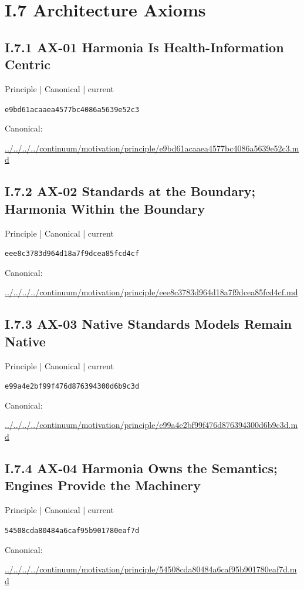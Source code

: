 \documentclass[10pt,a4paper]{article}
\begin{document}
\section*{I.7 Architecture Axioms}
\subsection*{I.7.1 AX-01 Harmonia Is Health-Information Centric}
\label{element-e9bd61acaaea4577bc4086a5639e52c3}
{\small Principle | Canonical | current}\par
\texttt{e9bd61acaaea4577bc4086a5639e52c3}\par
Canonical: \par
{\footnotesize\url{../../../../continuum/motivation/principle/e9bd61acaaea4577bc4086a5639e52c3.md}}\par
\subsection*{I.7.2 AX-02 Standards at the Boundary; Harmonia Within the Boundary}
\label{element-eee8c3783d964d18a7f9dcea85fcd4cf}
{\small Principle | Canonical | current}\par
\texttt{eee8c3783d964d18a7f9dcea85fcd4cf}\par
Canonical: \par
{\footnotesize\url{../../../../continuum/motivation/principle/eee8c3783d964d18a7f9dcea85fcd4cf.md}}\par
\subsection*{I.7.3 AX-03 Native Standards Models Remain Native}
\label{element-e99a4e2bf99f476d876394300d6b9c3d}
{\small Principle | Canonical | current}\par
\texttt{e99a4e2bf99f476d876394300d6b9c3d}\par
Canonical: \par
{\footnotesize\url{../../../../continuum/motivation/principle/e99a4e2bf99f476d876394300d6b9c3d.md}}\par
\subsection*{I.7.4 AX-04 Harmonia Owns the Semantics; Engines Provide the Machinery}
\label{element-54508cda80484a6caf95b901780eaf7d}
{\small Principle | Canonical | current}\par
\texttt{54508cda80484a6caf95b901780eaf7d}\par
Canonical: \par
{\footnotesize\url{../../../../continuum/motivation/principle/54508cda80484a6caf95b901780eaf7d.md}}\par
\end{document}
